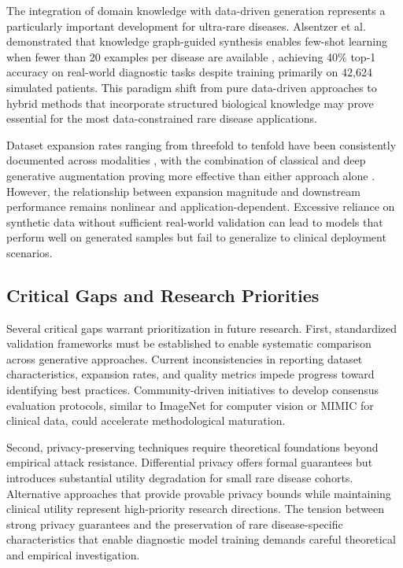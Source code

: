 The integration of domain knowledge with data-driven generation represents a particularly important development for ultra-rare diseases. Alsentzer et al. demonstrated that knowledge graph-guided synthesis enables few-shot learning when fewer than 20 examples per disease are available \cite{alsentzer2025few}, achieving 40\% top-1 accuracy on real-world diagnostic tasks despite training primarily on 42,624 simulated patients. This paradigm shift from pure data-driven approaches to hybrid methods that incorporate structured biological knowledge may prove essential for the most data-constrained rare disease applications.

Dataset expansion rates ranging from threefold to tenfold have been consistently documented across modalities \cite{finetti2025data,mendes2025synthetic}, with the combination of classical and deep generative augmentation proving more effective than either approach alone \cite{fridadar2018gan}. However, the relationship between expansion magnitude and downstream performance remains nonlinear and application-dependent. Excessive reliance on synthetic data without sufficient real-world validation can lead to models that perform well on generated samples but fail to generalize to clinical deployment scenarios.

\subsection{Critical Gaps and Research Priorities}

Several critical gaps warrant prioritization in future research. First, standardized validation frameworks must be established to enable systematic comparison across generative approaches. Current inconsistencies in reporting dataset characteristics, expansion rates, and quality metrics impede progress toward identifying best practices. Community-driven initiatives to develop consensus evaluation protocols, similar to ImageNet for computer vision or MIMIC for clinical data, could accelerate methodological maturation.

Second, privacy-preserving techniques require theoretical foundations beyond empirical attack resistance. Differential privacy offers formal guarantees but introduces substantial utility degradation for small rare disease cohorts. Alternative approaches that provide provable privacy bounds while maintaining clinical utility represent high-priority research directions. The tension between strong privacy guarantees and the preservation of rare disease-specific characteristics that enable diagnostic model training demands careful theoretical and empirical investigation.

